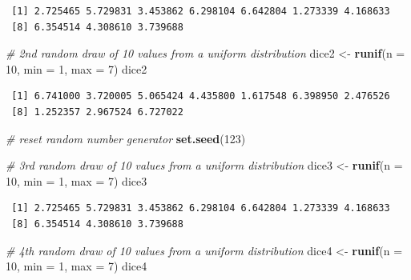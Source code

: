 \documentclass[]{article}
\newenvironment{Shaded}{\begin{snugshade}}{\end{snugshade}}
\newcommand{\CommentTok}[1]{\textcolor[rgb]{0.56,0.35,0.01}{\textit{#1}}}
\newcommand{\DataTypeTok}[1]{\textcolor[rgb]{0.13,0.29,0.53}{#1}}
\newcommand{\DecValTok}[1]{\textcolor[rgb]{0.00,0.00,0.81}{#1}}
\newcommand{\KeywordTok}[1]{\textcolor[rgb]{0.13,0.29,0.53}{\textbf{#1}}}
\newcommand{\NormalTok}[1]{#1}
\newcommand{\StringTok}[1]{\textcolor[rgb]{0.31,0.60,0.02}{#1}}
\begin{document}
\begin{verbatim}
 [1] 2.725465 5.729831 3.453862 6.298104 6.642804 1.273339 4.168633
 [8] 6.354514 4.308610 3.739688
\end{verbatim}

\begin{Shaded}
\begin{Highlighting}[]
\CommentTok{# 2nd random draw of 10 values from a uniform distribution}
\NormalTok{dice2 <-}\StringTok{ }\KeywordTok{runif}\NormalTok{(}\DataTypeTok{n =} \DecValTok{10}\NormalTok{, }\DataTypeTok{min =} \DecValTok{1}\NormalTok{, }\DataTypeTok{max =} \DecValTok{7}\NormalTok{)}
\NormalTok{dice2}
\end{Highlighting}
\end{Shaded}

\begin{verbatim}
 [1] 6.741000 3.720005 5.065424 4.435800 1.617548 6.398950 2.476526
 [8] 1.252357 2.967524 6.727022
\end{verbatim}

\begin{Shaded}
\begin{Highlighting}[]
\CommentTok{# reset random number generator}
\KeywordTok{set.seed}\NormalTok{(}\DecValTok{123}\NormalTok{)}

\CommentTok{# 3rd random draw of 10 values from a uniform distribution}
\NormalTok{dice3 <-}\StringTok{ }\KeywordTok{runif}\NormalTok{(}\DataTypeTok{n =} \DecValTok{10}\NormalTok{, }\DataTypeTok{min =} \DecValTok{1}\NormalTok{, }\DataTypeTok{max =} \DecValTok{7}\NormalTok{)}
\NormalTok{dice3}
\end{Highlighting}
\end{Shaded}

\begin{verbatim}
 [1] 2.725465 5.729831 3.453862 6.298104 6.642804 1.273339 4.168633
 [8] 6.354514 4.308610 3.739688
\end{verbatim}

\begin{Shaded}
\begin{Highlighting}[]
\CommentTok{# 4th random draw of 10 values from a uniform distribution}
\NormalTok{dice4 <-}\StringTok{ }\KeywordTok{runif}\NormalTok{(}\DataTypeTok{n =} \DecValTok{10}\NormalTok{, }\DataTypeTok{min =} \DecValTok{1}\NormalTok{, }\DataTypeTok{max =} \DecValTok{7}\NormalTok{)}
\NormalTok{dice4}
\end{Highlighting}
\end{Shaded}
\end{document}
